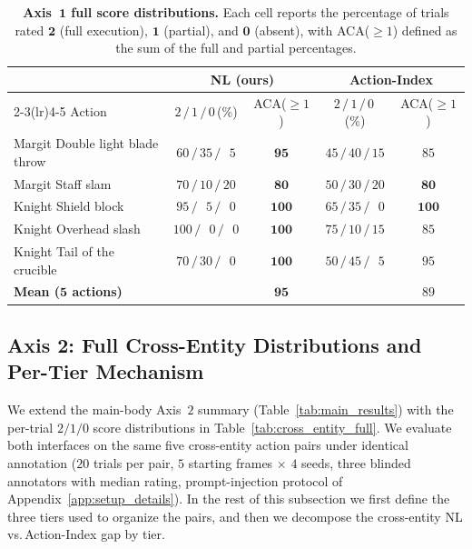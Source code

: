 \begin{table}[h]
  \caption{\textbf{Axis~$\mathbf{1}$ full score distributions.} Each cell reports the percentage of trials rated $\mathbf{2}$ (full execution), $\mathbf{1}$ (partial), and $\mathbf{0}$ (absent), with ACA($\geq 1$) defined as the sum of the full and partial percentages.}
  \label{tab:indist_full}
  \centering
  \setlength{\tabcolsep}{4pt}
  \begin{tabular}{lcccc}
    \toprule
    & \multicolumn{2}{c}{\textbf{NL (ours)}} & \multicolumn{2}{c}{\textbf{Action-Index}} \\
    \cmidrule(lr){2-3}\cmidrule(lr){4-5}
    Action
      & $2\,/\,1\,/\,0$\,(\%) & ACA($\geq 1$)
      & $2\,/\,1\,/\,0$\,(\%) & ACA($\geq 1$) \\
    \midrule
    Margit \textperiodcentered{} Double light blade throw
      & $60\,/\,35\,/\,\phantom{0}5$ & $\mathbf{95}$
      & $45\,/\,40\,/\,15$           & $85$            \\
    Margit \textperiodcentered{} Staff slam
      & $70\,/\,10\,/\,20$           & $\mathbf{80}$
      & $50\,/\,30\,/\,20$           & $\mathbf{80}$   \\
    Knight \textperiodcentered{} Shield block
      & $95\,/\,\phantom{0}5\,/\,\phantom{0}0$ & $\mathbf{100}$
      & $65\,/\,35\,/\,\phantom{0}0$           & $\mathbf{100}$ \\
    Knight \textperiodcentered{} Overhead slash
      & $100\,/\,\phantom{0}0\,/\,\phantom{0}0$ & $\mathbf{100}$
      & $75\,/\,10\,/\,15$                      & $85$           \\
    Knight \textperiodcentered{} Tail of the crucible
      & $70\,/\,30\,/\,\phantom{0}0$           & $\mathbf{100}$
      & $50\,/\,45\,/\,\phantom{0}5$           & $95$            \\
    \midrule
    \textbf{Mean ($\mathbf{5}$ actions)} & & $\mathbf{95}$ & & $89$ \\
    \bottomrule
  \end{tabular}
\end{table}

\subsection{Axis 2: Full Cross-Entity Distributions and Per-Tier Mechanism}
\label{app:axis2_tiers}

We extend the main-body Axis~$2$ summary (Table~\ref{tab:main_results}) with the per-trial $2/1/0$ score distributions in Table~\ref{tab:cross_entity_full}. We evaluate both interfaces on the same five cross-entity action pairs under identical annotation ($20$ trials per pair, $5$ starting frames $\times$ $4$ seeds, three blinded annotators with median rating, prompt-injection protocol of Appendix~\ref{app:setup_details}). In the rest of this subsection we first define the three tiers used to organize the pairs, and then we decompose the cross-entity NL\,vs.\,Action-Index gap by tier.

